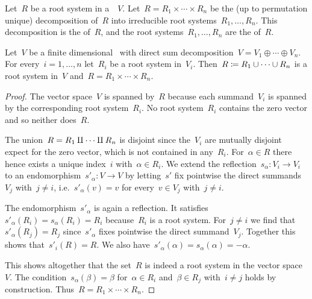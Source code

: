 \begin{definition}
  Let~$R$ be a root system in a~{\vectorspace{$\kf$}}~$V$.
  Let~$R = R_1 \times \dotsb \times R_n$ be the (up to permutation unique) decomposition of~$R$ into irreducible root systems~$R_1, \dotsc, R_n$.
  This decomposition is the  of~$R$, and the root systems~$R_1, \dotsc, R_n$ are the  of~$R$.
\end{definition}


\begin{lemma}
  \label{combining root systems}
  Let~$V$ be a finite dimensional~{\vectorspace{$\kf$}} with direct sum decomposition~$V = V_1 \oplus \dotsb \oplus V_n$.
  For every~$i = 1, \dotsc, n$ let~$R_i$ be a root system in~$V_i$.
  Then~$R \coloneqq R_1 \cup \dotsb \cup R_n$ is a root system in~$V$ and~$R = R_1 \times \dotsb \times R_n$.
\end{lemma}


\begin{proof}
  The vector space~$V$ is spanned by~$R$ because each summand~$V_i$ is spanned by the corresponding root system~$R_i$.
  No root system~$R_i$ contains the zero vector and so neither does~$R$.
  
  The union~$R = R_1 \amalg \dotsb \amalg R_n$ is disjoint since the~$V_i$ are mutually disjoint expect for the zero vector, which is not contained in any~$R_i$.
  For~$\alpha \in R$ there hence exists a unique index~$i$ with~$\alpha \in R_i$.
  We extend the reflection~$s_\alpha \colon V_i \to V_i$ to an endomorphism~$s'_\alpha \colon V \to V$ by letting~$s'$ fix pointwise the direct summands~$V_j$ with~$j \neq i$, i.e.~$s'_\alpha(v) = v$ for every~$v \in V_j$ with~$j \neq i$.
  
  The endomorphism~$s'_\alpha$ is again a reflection.
  It satisfies~$s'_\alpha(R_i) = s_\alpha(R_i) = R_i$ because~$R_i$ is a root system.
  For~$j \neq i$ we find that~$s'_\alpha(R_j) = R_j$ since~$s'_\alpha$ fixes pointwise the direct summand~$V_j$.
  Together this shows that~$s'_i(R) = R$.
  We also have~$s'_\alpha(\alpha) = s_\alpha(\alpha) = -\alpha$.
  
  This shows altogether that the set~$R$ is indeed a root system in the vector space~$V$.
  The condition~$s_\alpha(\beta) = \beta$ for~$\alpha \in R_i$ and~$\beta \in R_j$ with~$i \neq j$ holds by construction.
  Thus~$R = R_1 \times \dotsm \times R_n$. 
\end{proof}


